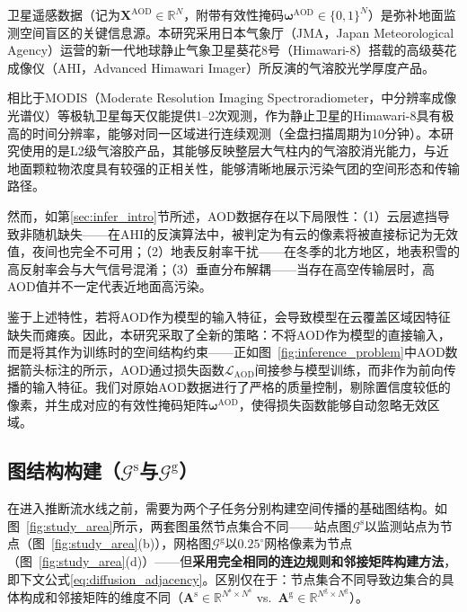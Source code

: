 卫星遥感数据（记为$\mathbf{X}^{\text{AOD}} \in \mathbb{R}^{N}$，附带有效性掩码$\boldsymbol{\omega}^{\text{AOD}} \in \{0,1\}^{N}$）是弥补地面监测空间盲区的关键信息源。本研究采用日本气象厅（JMA，Japan Meteorological Agency）运营的新一代地球静止气象卫星葵花8号（Himawari-8）搭载的高级葵花成像仪（AHI，Advanced Himawari Imager）所反演的气溶胶光学厚度产品\citep{bessho2016introduction}。

相比于MODIS（Moderate Resolution Imaging Spectroradiometer，中分辨率成像光谱仪）等极轨卫星每天仅能提供1--2次观测，作为静止卫星的Himawari-8具有极高的时间分辨率，能够对同一区域进行连续观测（全盘扫描周期为10分钟）\citep{wei2021himawari}。本研究使用的是L2级气溶胶产品，其能够反映整层大气柱内的气溶胶消光能力，与近地面颗粒物浓度具有较强的正相关性，能够清晰地展示污染气团的空间形态和传输路径。

然而，如第\ref{sec:infer_intro}节所述，AOD数据存在以下局限性：（1）云层遮挡导致非随机缺失——在AHI的反演算法中，被判定为有云的像素将被直接标记为无效值，夜间也完全不可用；（2）地表反射率干扰——在冬季的北方地区，地表积雪的高反射率会与大气信号混淆；（3）垂直分布解耦——当存在高空传输层时，高AOD值并不一定代表近地面高污染。

鉴于上述特性，若将AOD作为模型的输入特征，会导致模型在云覆盖区域因特征缺失而瘫痪。因此，本研究采取了全新的策略：不将AOD作为模型的直接输入，而是将其作为训练时的空间结构约束——正如图~\ref{fig:inference_problem}中AOD数据箭头标注的所示，AOD通过损失函数$\mathcal{L}_{\mathrm{AOD}}$间接参与模型训练，而非作为前向传播的输入特征。我们对原始AOD数据进行了严格的质量控制，剔除置信度较低的像素，并生成对应的有效性掩码矩阵$\boldsymbol{\omega}^{\text{AOD}}$，使得损失函数能够自动忽略无效区域。

\subsection[图结构构建（\texorpdfstring{$\mathcal{G}^{\text{s}}$}{Gs}与\texorpdfstring{$\mathcal{G}^{\text{g}}$}{Gg}）]{图结构构建（$\mathcal{G}^{\text{s}}$与$\mathcal{G}^{\text{g}}$）}
\label{subsec:spin_graph}

在进入推断流水线之前，需要为两个子任务分别构建空间传播的基础图结构。如图~\ref{fig:study_area}所示，两套图虽然节点集合不同——站点图$\mathcal{G}^{\text{s}}$以监测站点为节点（图~\ref{fig:study_area}(b)），网格图$\mathcal{G}^{\text{g}}$以$0.25^{\circ}$网格像素为节点（图~\ref{fig:study_area}(d)）——但\textbf{采用完全相同的连边规则和邻接矩阵构建方法}，即下文公式\eqref{eq:diffusion_adjacency}。区别仅在于：节点集合不同导致边集合的具体构成和邻接矩阵的维度不同（$\mathbf{A}^{\text{s}} \in \mathbb{R}^{N^{\text{s}} \times N^{\text{s}}}$ vs.\ $\mathbf{A}^{\text{g}} \in \mathbb{R}^{N^{\text{g}} \times N^{\text{g}}}$）。

